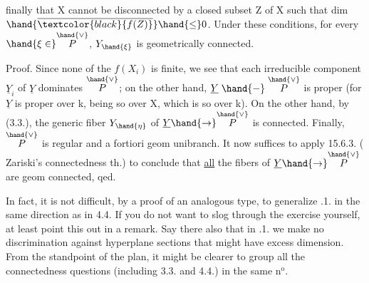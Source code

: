 finally that X cannot be disconnected by a closed subset Z of X such
that dim $\hand{\overline{\textcolor{black}{f(Z)}}} \hand{\leq} 0$. Under these conditions, for every $\hand{\xi \in} \overset{\hand{\vee}}{P}$, $Y_{\hand{\xi}}$ is
geometrically connected.

Proof. Since  none of the $f(X_i)$ is finite, we see
that each irreducible component $\underline{Y}_i$ of $\underline{Y}$ dominates $\overset{\hand{\vee}}{P}$;
on the other hand, $\underline{Y} \mathrel{\hand{-}} \overset{\hand{\vee}}{P}$ is proper (for $\underline{Y}$ is proper over k, being so over X,
which is so over k). On the other hand, by (3.3.), the generic fiber
$Y_{\hand{\eta}}$ of $\underline{Y} \hand{\to} \overset{\hand{\vee}}{P}$ is  connected. Finally, $\overset{\hand{\vee}}{P}$ is regular and
a fortiori geom unibranch. It now suffices to apply 15.6.3.
( Zariski's connectedness th.) to conclude
that \uline{all} the fibers of $\underline{Y} \hand{\to} \overset{\hand{\vee}}{P}$ are geom connected, qed.

 In fact, it is not difficult, by a proof of an analogous
type, to generalize .1. in the same direction as in 4.4. If you do not
want to slog through the exercise yourself, at least point this out in a
remark. Say there also that in .1. we make no discrimination
against hyperplane sections that might have excess
 dimension. From the standpoint of the plan, it might be clearer to group
all the connectedness questions (including 3.3. and 4.4.) in
the same n$^{\text{o}}$.
